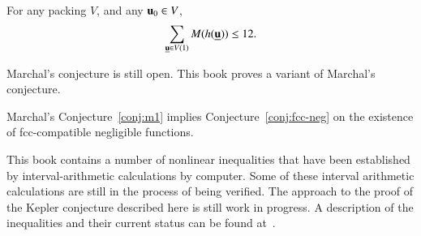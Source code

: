 \begin{conjecture}[Marchal]\label{conj:m1} For any packing $ V$, and
any $ {\mathbf u}_0\in V$, 
$$
\sum_{{\underline{{\mathbf u}}}\in V(1)} M(h({\underline{{\mathbf u}}})) \le 12.
$$
\end{conjecture}

Marchal's conjecture is still open.  This book proves a variant of Marchal's conjecture.

\begin{theorem}\label{theorem:mk1}
Marchal's Conjecture~\ref{conj:m1} implies Conjecture~\ref{conj:fcc-neg} on the existence of fcc-compatible negligible functions.
\end{theorem}

\begin{note}%
This book contains a number of nonlinear inequalities that have been established by interval-arithmetic calculations by computer.   Some of these interval arithmetic calculations are still in the process of being verified.  The approach to the proof of the Kepler conjecture described here is still work in progress.  A description of the inequalities and their current status can be found at~\cite{hales:2009:nonlinear}. 
\end{note}

